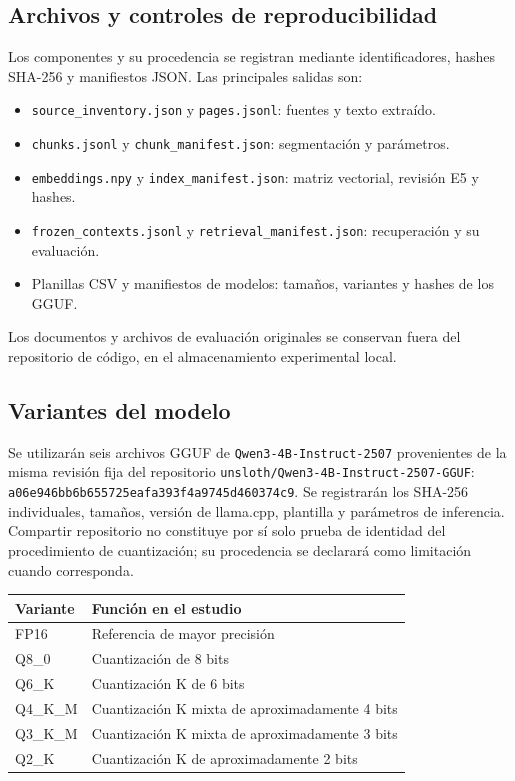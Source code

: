 \documentclass[11pt,a4paper]{article}
\begin{document}
\subsection{Archivos y controles de reproducibilidad}
Los componentes y su procedencia se registran mediante identificadores, hashes SHA-256 y manifiestos JSON. Las principales salidas son:
\begin{itemize}[nosep]
    \item \texttt{source\_inventory.json} y \texttt{pages.jsonl}: fuentes y texto extraído.
    \item \texttt{chunks.jsonl} y \texttt{chunk\_manifest.json}: segmentación y parámetros.
    \item \texttt{embeddings.npy} y \texttt{index\_manifest.json}: matriz vectorial, revisión E5 y hashes.
    \item \texttt{frozen\_contexts.jsonl} y \texttt{retrieval\_manifest.json}: recuperación y su evaluación.
    \item Planillas CSV y manifiestos de modelos: tamaños, variantes y hashes de los GGUF.
\end{itemize}
Los documentos y archivos de evaluación originales se conservan fuera del repositorio de código, en el almacenamiento experimental local.

\subsection{Variantes del modelo}
Se utilizarán seis archivos GGUF de \texttt{Qwen3-4B-Instruct-2507} provenientes de la misma revisión fija del repositorio \texttt{unsloth/Qwen3-4B-Instruct-2507-GGUF}: \texttt{a06e946bb6b655725eafa393f4a9745d460374c9}. Se registrarán los SHA-256 individuales, tamaños, versión de llama.cpp, plantilla y parámetros de inferencia. Compartir repositorio no constituye por sí solo prueba de identidad del procedimiento de cuantización; su procedencia se declarará como limitación cuando corresponda.

\begin{center}
\begin{tabular}{ll}
\toprule
Variante & Función en el estudio\\
\midrule
FP16 & Referencia de mayor precisión\\
Q8\_0 & Cuantización de 8 bits\\
Q6\_K & Cuantización K de 6 bits\\
Q4\_K\_M & Cuantización K mixta de aproximadamente 4 bits\\
Q3\_K\_M & Cuantización K mixta de aproximadamente 3 bits\\
Q2\_K & Cuantización K de aproximadamente 2 bits\\
\bottomrule
\end{tabular}
\end{center}
\end{document}
